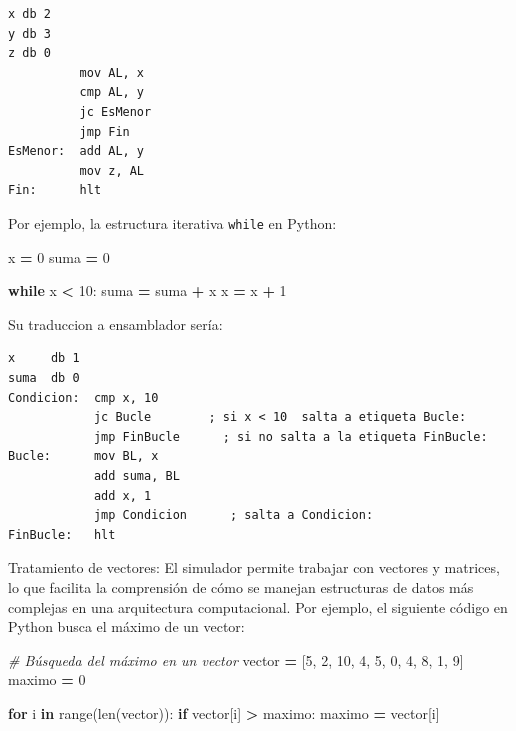 \documentclass[12pt,oneside]{templates/unerthesis}
\newenvironment{Shaded}{\begin{snugshade}}{\end{snugshade}}
\newcommand{\BuiltInTok}[1]{#1}
\newcommand{\CommentTok}[1]{\textcolor[rgb]{0.56,0.35,0.01}{\textit{#1}}}
\newcommand{\ControlFlowTok}[1]{\textcolor[rgb]{0.13,0.29,0.53}{\textbf{#1}}}
\newcommand{\DecValTok}[1]{\textcolor[rgb]{0.00,0.00,0.81}{#1}}
\newcommand{\KeywordTok}[1]{\textcolor[rgb]{0.13,0.29,0.53}{\textbf{#1}}}
\newcommand{\NormalTok}[1]{#1}
\newcommand{\OperatorTok}[1]{\textcolor[rgb]{0.81,0.36,0.00}{\textbf{#1}}}
\begin{document}
\begin{lstlisting}
x db 2 
y db 3
z db 0
          mov AL, x
          cmp AL, y
          jc EsMenor
          jmp Fin
EsMenor:  add AL, y
          mov z, AL 
Fin:      hlt\end{lstlisting}

Por ejemplo, la estructura iterativa \texttt{while} en Python:

\begin{Shaded}
\begin{Highlighting}[]
\NormalTok{x }\OperatorTok{=} \DecValTok{0}
\NormalTok{suma }\OperatorTok{=} \DecValTok{0}

\ControlFlowTok{while}\NormalTok{ x }\OperatorTok{\textless{}} \DecValTok{10}\NormalTok{:}
\NormalTok{    suma }\OperatorTok{=}\NormalTok{ suma }\OperatorTok{+}\NormalTok{ x}
\NormalTok{    x }\OperatorTok{=}\NormalTok{ x }\OperatorTok{+} \DecValTok{1}
\end{Highlighting}
\end{Shaded}

Su traduccion a ensamblador sería:

\begin{lstlisting}
x     db 1   
suma  db 0   
Condicion:  cmp x, 10 
            jc Bucle        ; si x < 10  salta a etiqueta Bucle:
            jmp FinBucle      ; si no salta a la etiqueta FinBucle:
Bucle:      mov BL, x
            add suma, BL
            add x, 1
            jmp Condicion      ; salta a Condicion:
FinBucle:   hlt
\end{lstlisting}

Tratamiento de vectores: El simulador permite trabajar con vectores y matrices, lo que facilita la comprensión de cómo se manejan estructuras de datos más complejas en una arquitectura computacional. Por ejemplo, el siguiente código en Python busca el máximo de un vector:

\begin{Shaded}
\begin{Highlighting}[]
\CommentTok{\# Búsqueda del máximo en un vector}
\NormalTok{vector }\OperatorTok{=}\NormalTok{ [}\DecValTok{5}\NormalTok{, }\DecValTok{2}\NormalTok{, }\DecValTok{10}\NormalTok{, }\DecValTok{4}\NormalTok{, }\DecValTok{5}\NormalTok{, }\DecValTok{0}\NormalTok{, }\DecValTok{4}\NormalTok{, }\DecValTok{8}\NormalTok{, }\DecValTok{1}\NormalTok{, }\DecValTok{9}\NormalTok{]}
\NormalTok{maximo }\OperatorTok{=} \DecValTok{0}

\ControlFlowTok{for}\NormalTok{ i }\KeywordTok{in} \BuiltInTok{range}\NormalTok{(}\BuiltInTok{len}\NormalTok{(vector)):}
    \ControlFlowTok{if}\NormalTok{ vector[i] }\OperatorTok{\textgreater{}}\NormalTok{ maximo:}
\NormalTok{        maximo }\OperatorTok{=}\NormalTok{ vector[i]}
\end{Highlighting}
\end{Shaded}
\end{document}
